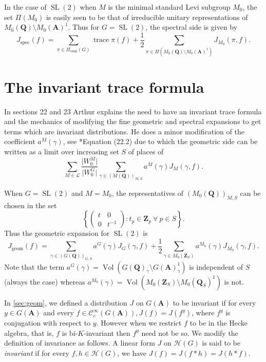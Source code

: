 \documentclass[11pt]{amsart}
\def\A{\mathbf A}
\def\Q{\mathbf Q}
\def\Z{\mathbf Z}
\def\CCC{\mathcal C}
\def\HHH{\mathcal H}
\def\LLL{\mathcal L}
\def\cb#1{{\color{blue}#1}}
\def\bs{\setminus} 			%
\def\mod#1{\lvert #1 \rvert} %
\def\sl{\operatorname{SL}}
\def\trace{\operatorname{trace}}
\def\vol{\operatorname{Vol}}
\theoremstyle{remark}
\begin{document}
\cb{In the case of $\sl(2)$ when $M$ is the minimal standard Levi subgroup $M_0$, the set $\Pi(M_0)$ is easily seen to be that of irreducible unitary representations of $M_0(\Q)\bs M_0(\A)^1$. Thus for $G = \sl(2)$, the spectral side is given by
\begin{equation} \label{spec}
	J_{\text{spec}}(f) = \sum_{\pi \in \Pi_{\text{cusp}}(G)} \trace \pi(f) + \frac{1}{2}
		\sum_{\pi \in \Pi(M_0(\Q)\bs M_0(\A)^1)} J_{M_0}(\pi, f). 
\end{equation}
}

\section{The invariant trace formula}

In sections 22 and 23 Arthur explains the need to have an invariant trace formula and the mechanics of modifying the fine geometric and spectral expansions to get terms which are invariant distributions. He does a minor modification of the coefficient $a^M(\gamma)$, see \cite{clay}*{Equation (22.2)} due to which the geometric side can be written as a limit over increasing set $S$ of places of
\[ \sum_{M \in \LLL} \frac{\mod{W_0^M}}{\mod{W_0^G}} \sum_{\gamma \in (M(\Q))_{M, S}} a^M(\gamma) J_M(\gamma, f). \]

\cb{When $G=\sl(2)$ and $M=M_0$, the representatives of $(M_0(\Q))_{M, S}$ can be chosen in the set 
\[ \left \{ \begin{pmatrix} t & 0 \\ 0 & t^{-1} \end{pmatrix} : t_p \in \Z_p \ \forall \ p \in S \right \}. \]
Thus the geometric expansion for $\sl(2)$ is 
\[ J_{\text{geom}}(f) = \sum_{\gamma \in (G(\Q))_{G, S}} a^G(\gamma) J_G(\gamma, f) + 
		\frac{1}{2} \sum_{\gamma \in M_0(\Z_S)} a^{M_0}(\gamma) J_{M_0}(\gamma, f). \]
Note that the term $a^G(\gamma) = \vol(G(\Q)_\gamma \bs G(\A)^1_\gamma)$ is independent of $S$ (always the case) whereas $a^{M_0}(\gamma) = \vol (M_0(\Z_S)\bs M_0(\Q_S)^1)$ is not. 
}

In \cref{sec:geom}, we defined a distribution $J$ on $G(\A)$ to be invariant if for every $y \in G(\A)$ and every $f \in \CCC_c^\infty(G(\A)), J(f) = J(f^y)$, where $f^y$ is conjugation with respect to $y$. However when we restrict $f$ to be in the Hecke algebra, that is, $f$ is bi-$K$-invariant then $f^y$ need not be so. We modify the definition of invariance as follows. A linear form $J$ on $\HHH(G)$ is said to be \textit{invariant} if for every $f, h \in \HHH(G)$, we have $J(f) = J(f*h) = J(h*f)$.
\end{document}
